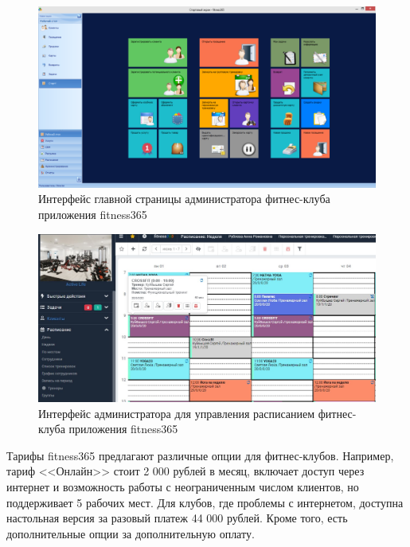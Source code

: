 \begin{figure}[ht!]
	\begin{center}
		\includegraphics[scale=0.35]{./img/f365-1.png}
	\end{center}
	\caption{Интерфейс главной страницы администратора фитнес-клуба приложения fitness365}
	\label{fig:f365-1}
\end{figure}

\begin{figure}[ht!]
	\begin{center}
		\includegraphics[scale=0.45]{./img/f365-2.png}
	\end{center}
	\caption{Интерфейс администратора для управления расписанием фитнес-клуба приложения fitness365}
	\label{fig:f365-2}
\end{figure}

Тарифы fitness365 предлагают различные опции для фитнес-клубов. Например, тариф <<Онлайн>> стоит 2 000 рублей в месяц, включает доступ через интернет и возможность работы с неограниченным числом клиентов, но поддерживает 5 рабочих мест. Для клубов, где проблемы с интернетом, доступна настольная версия за разовый платеж 44 000 рублей. Кроме того, есть дополнительные опции за дополнительную оплату.

